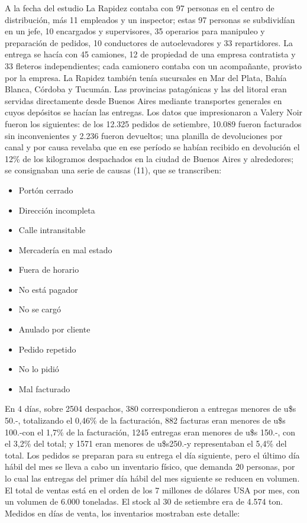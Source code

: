 \documentclass[a4paper,10pt]{article}
\begin{document}
	A la fecha del estudio La Rapidez contaba con 97 personas en el centro de distribución, más 11 empleados y un inspector; estas 97 personas se subdividían en un jefe, 10 encargados y supervisores, 35 operarios para manipuleo y preparación de pedidos, 10 conductores de autoelevadores y 33 repartidores. La entrega se hacía con 45 camiones, 12 de propiedad de una empresa contratista y 33 fleteros independientes; cada camionero contaba con un acompañante, provisto por la empresa. La Rapidez también tenía sucursales en Mar del Plata, Bahía Blanca, Córdoba y Tucumán. Las provincias patagónicas y las del litoral eran servidas directamente desde Buenos Aires mediante transportes generales en cuyos depósitos se hacían las entregas.
	Los datos que impresionaron a Valery Noir fueron los siguientes: de los 12.325 pedidos de setiembre, 10.089 fueron facturados sin inconvenientes y 2.236 fueron devueltos; una planilla de devoluciones por canal y por causa revelaba que en ese período se habían recibido en devolución el 12\% de los kilogramos despachados en la ciudad de Buenos Aires y alrededores; se consignaban una serie de causas (11), que se transcriben:\\
	\begin{itemize}
	\item	Portón cerrado
	\item Dirección incompleta
	\item Calle intransitable
	\item Mercadería en mal estado
	\item Fuera de horario
	\item No está pagador
	\item No se cargó
	\item Anulado por cliente
	\item Pedido repetido
	\item No lo pidió
	\item Mal facturado
	\end{itemize}
	En 4 días, sobre 2504 despachos, 380 correspondieron a entregas menores de u\$s 50.-, totalizando el 0,46\% de la facturación, 882 facturas eran menores de u\$s 100.-con el 1,7\% de la facturación, 1245 entregas eran menores de u\$s 150.-, con el 3,2\% del total; y 1571 eran menores de u\$s250.-y representaban el 5,4\% del total. Los pedidos se preparan para su entrega el día siguiente, pero el último día hábil del mes se lleva a cabo un inventario físico, que demanda 20 personas, por lo cual las entregas del primer día hábil del mes siguiente se reducen en volumen. El total de ventas está en el orden de los 7 millones de dólares USA por mes, con un volumen de 6.000 toneladas. El stock al 30 de setiembre era de 4.574 ton. Medidos en días de venta, los inventarios mostraban este detalle:\\
\end{document}
